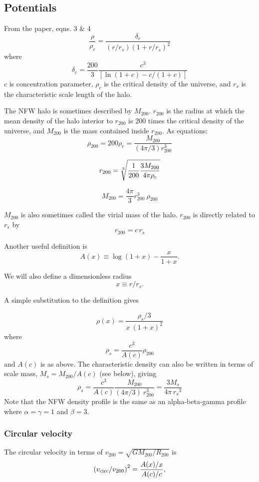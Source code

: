 \subsection{Potentials}\label{potentials}

From the \citet{nfw1996} paper, eqns. 3 \& 4 \[
\frac{\rho}{\rho_c} = \frac{\delta_c}{(r/r_s)(1+r/r_s)^2}
\] where \[
\delta_c = \frac{200}{3}\frac{c^3}{[\ln(1+c)-c/(1+c)]}
\] \(c\) is concentration parameter, \(\rho_c\) is the critical density
of the universe, and \(r_s\) is the characteristic scale length of the
halo.

The NFW halo is sometimes described by \(M_{200}\). \(r_{200}\) is the
radius at which the mean density of the halo interior to \(r_{200}\) is
200 times the critical density of the universe, and \(M_{200}\) is the
mass contained inside \(r_{200}\). As equations: \[
\rho_{200} = 200\rho_{c} = \frac{M_{200}}{(4\pi/3) r_{200}^3}
\]

\[
r_{200} = \sqrt[3]{\frac{1}{200}\frac{3M_{200}}{4\pi \rho_{\rm c
}}}
\]

\[
M_{200} = \frac{4\pi}{3} r_{200}^3\ \rho_{200}
\]

\(M_{200}\) is also sometimes called the virial mass of the halo.
\(r_{200}\) is directly related to \(r_s\) by \[
r_{200} = c\,r_s
\]

Another useful definition is \[
A(x) \equiv \log (1+x) - \frac{x}{1+x}.
\]

We will also define a dimensionless radius \[
x \equiv r/r_s.
\]

A simple substitution to the definition gives

\[
\rho(x) =  \frac{\rho_s/3}{x\ (1+x)^2}
\] where \[
\rho_s = \frac{c^3}{A(c)} \rho_{200}
\] and \(A(c)\) is as above. The characteristic density can also be
written in terms of scale mass, \(M_s = M_{200}/{A(c)}\) (see below),
giving \[
\rho_s = \frac{c^3}{A(c)} \frac{M_{200}}{(4\pi/3)\ r_{200}^3}  = \frac{3M_s}{4\pi\, {r_s}^3}
\] Note that the NFW density profile is the same as an alpha-beta-gamma
profile where \(\alpha=\gamma=1\) and \(\beta =3\).

\subsubsection{Circular velocity}\label{circular-velocity}

The circular velocity in terms of
\(v_{200} = \sqrt{G M_{200} / R_{200}}\) is \[
\left(v_{\rm circ}/v_{200}\right)^2 = \frac{A(x)/x}{A(c)/c},
\]

